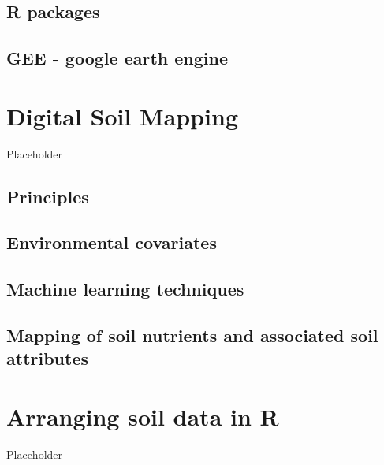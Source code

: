 \documentclass[
  10pt,
  b5paper,
  oneside]{book}
\begin{document}
\hypertarget{r-packages}{%
\section{R packages}\label{r-packages}}

\hypertarget{gee---google-earth-engine}{%
\section{GEE - google earth engine}\label{gee---google-earth-engine}}

\hypertarget{digital-soil-mapping}{%
\chapter{Digital Soil Mapping}\label{digital-soil-mapping}}

Placeholder

\hypertarget{principles}{%
\section{Principles}\label{principles}}

\hypertarget{environmental-covariates}{%
\section{Environmental covariates}\label{environmental-covariates}}

\hypertarget{machine-learning-techniques}{%
\section{Machine learning techniques}\label{machine-learning-techniques}}

\hypertarget{mapping-of-soil-nutrients-and-associated-soil-attributes}{%
\section{Mapping of soil nutrients and associated soil attributes}\label{mapping-of-soil-nutrients-and-associated-soil-attributes}}

\hypertarget{arranging-soil-data-in-r}{%
\chapter{\texorpdfstring{Arranging soil data in \textbf{R}}{Arranging soil data in R}}\label{arranging-soil-data-in-r}}

Placeholder
\end{document}
